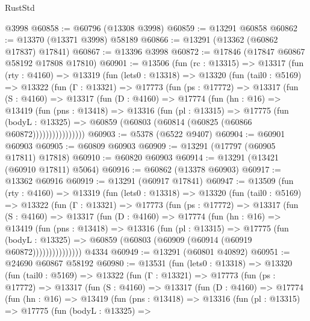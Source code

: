 \begin{lexlean}{RustStd}
\begin{coremodule}
    @3998
@60858 := @60796 (@13308 @3998)
@60859 := @13291 @60858
@60862 := @13370 (@13371 @3998) @58189
@60866 := @13291 (@13362 (@60862 @17837) @17841)
@60867 := @13396 @3998
@60872 := @17846 (@17847 @60867 @58192 @17808 @17810)
@60901 := @13506
    (fun (rc : @13315) =>
    @13317
      (fun (rty : @4160) =>
      @13319
        (fun (lets0 : @13318) =>
        @13320
          (fun (tail0 : @5169) =>
          @13322
            (fun (Γ : @13321) =>
            @17773
              (fun (ps : @17772) =>
              @13317
                (fun (S : @4160) =>
                @13317
                  (fun (D : @4160) =>
                  @17774
                    (fun (hn : @16) =>
                    @13419
                      (fun (pns : @13418) =>
                      @13316
                        (fun (pl : @13315) =>
                        @17775
                          (fun (bodyL : @13325) =>
                          @60859 (@60803 (@60814 (@60825 (@60866 @60872))))))))))))))))
@60903 := @5378 (@6522 @9407)
@60904 := @60901 @60903
@60905 := @60809 @60903
@60909 := @13291 (@17797 (@60905 @17811) @17818)
@60910 := @60820 @60903
@60914 := @13291 (@13421 (@60910 @17811) @5064)
@60916 := @60862 (@13378 @60903)
@60917 := @13362 @60916
@60919 := @13291 (@60917 @17841)
@60947 := @13509
    (fun (rty : @4160) =>
    @13319
      (fun (lets0 : @13318) =>
      @13320
        (fun (tail0 : @5169) =>
        @13322
          (fun (Γ : @13321) =>
          @17773
            (fun (ps : @17772) =>
            @13317
              (fun (S : @4160) =>
              @13317
                (fun (D : @4160) =>
                @17774
                  (fun (hn : @16) =>
                  @13419
                    (fun (pns : @13418) =>
                    @13316
                      (fun (pl : @13315) =>
                      @17775
                        (fun (bodyL : @13325) =>
                        @60859 (@60803 (@60909 (@60914 (@60919 @60872)))))))))))))))
    @4334
@60949 := @13291 (@60801 @40892)
@60951 := @24690 @60867 @58192
@60980 := @13531
    (fun (lets0 : @13318) =>
    @13320
      (fun (tail0 : @5169) =>
      @13322
        (fun (Γ : @13321) =>
        @17773
          (fun (ps : @17772) =>
          @13317
            (fun (S : @4160) =>
            @13317
              (fun (D : @4160) =>
              @17774
                (fun (hn : @16) =>
                @13419
                  (fun (pns : @13418) =>
                  @13316
                    (fun (pl : @13315) =>
                    @17775
                      (fun (bodyL : @13325) =>

\end{coremodule}
\end{lexlean}
